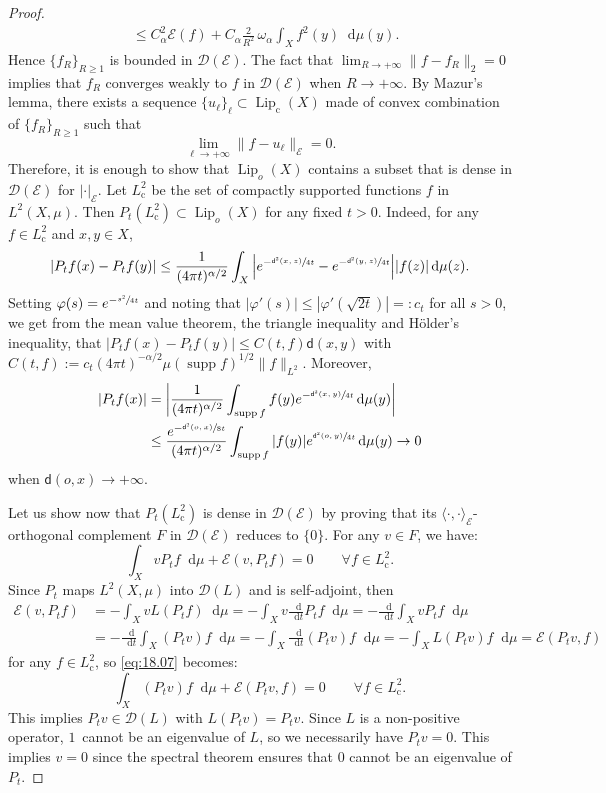 \documentclass[10pt]{amsart}
\newcommand{\rmc}{\mathrm{c}}
\theoremstyle{plain}
\theoremstyle{definition}
\newcommand{\cE}{\mathcal{E}}
\newcommand{\cD}{\mathcal{D}}
\let\phi\varphi
\newcommand{\di}{\mathop{}\!\mathrm{d}}
\DeclareMathOperator{\supp}{supp}
\DeclareMathOperator{\Lip}{Lip}
\newcommand{\dist}{\mathsf{d}}
\begin{document}
\begin{proof}
\begin{align*}
&\le C_\alpha^2 \cE(f)+C_\alpha \frac{2}{R^2}\, \omega_\alpha \int_X f^2(y)\di\mu(y).
\end{align*}
Hence $\{f_R\}_{R\ge 1}$ is bounded in $\cD(\cE)$. The fact that $\lim_{R\to +\infty} \|f-f_R\|_2=0$ implies that $f_R$ converges weakly to $f$ in $\cD(\cE)$ when $R\to+\infty$. By Mazur's lemma, there exists a sequence $\{u_\ell\}_\ell \subset \Lip_\rmc(X)$ made of convex combination of $\{f_R\}_{R\ge 1}$ such that
\[
\lim_{\ell\to +\infty} \|f-u_\ell\|_\cE=0.
\]
Therefore, it is enough to show that $\Lip_o(X)$ contains a subset that is dense in $\cD(\cE)$ for $|\cdot|_\cE$. Let $L^2_\rmc$ be the set of compactly supported functions $f$ in $L^2(X,\mu)$. Then $P_t(L^2_\rmc) \subset \Lip_o(X)$ for any fixed $t>0$. Indeed, for any $f \in L^2_\rmc$ and $x, y \in X$,
\[
|P_tf(x) - P_tf(y)|\le \frac{1}{(4\pi t)^{\alpha/2}} \int_X \Big|e^{-\sfrac{\dist^2(x,z)}{4t}}-e^{-\sfrac{\dist^2(y,z)}{4t}}\Big| |f(z)| \di \mu(z).
\]
Setting $\phi(s)=e^{-\sfrac{s^2}{4t}}$ and noting that $|\phi'(s)|\le |\phi'(\sqrt{2t})|=:c_t$ for all $s>0$, we get from the mean value theorem, the triangle inequality and Hölder's inequality, that $|P_tf(x) - P_tf(y)|\le C(t,f) \dist(x,y)$ with $C(t,f):=c_t(4 \pi t)^{-\alpha/2} \mu(\supp f)^{1/2} \| f \|_{L^2}$. Moreover,
\begin{align*}
|P_tf(x)| &= \left|\frac{1}{(4\pi t)^{\alpha/2}} \int_{\supp f} f(y) e^{-\sfrac{\dist^2(x,y)}{4t}} \di \mu(y)\right|\\
&\le \frac{ e^{-\sfrac{\dist^2(o,x)}{8t}} }{ (4\pi t)^{\alpha/2} } \int_{\supp f} |f(y)| e^{\sfrac{\dist^2(o,y)}{4t}} \di \mu(y) \to 0
\end{align*}
when $\dist(o,x) \to +\infty$.

Let us show now that $P_t(L^2_\rmc)$ is dense in $\cD(\cE)$ by proving that its $\langle \cdot, \cdot \rangle_{\cE}$-orthogonal complement $F$ in $\cD(\cE)$ reduces to $\{0\}$. For any $v\in F$, we have:
\begin{equation}\label{eq:18.07}
\int_X v P_t f \di \mu + \cE(v,P_t f)=0 \qquad \forall f \in L^2_\rmc.
\end{equation}
Since $P_t$ maps $L^2(X,\mu)$ into $\cD(L)$ and is self-adjoint, then
\begin{align*}
\cE(v,P_t f) & = - \int_X v L (P_t f) \di \mu = -\int_X v \frac{\di}{\di t} P_t f \di \mu = -\frac{\di}{\di t} \int_X v P_t f \di \mu\\
& = - \frac{\di}{\di t} \int_X (P_tv) f \di \mu
= -\int_X \frac{\di}{\di t}(P_tv) f \di \mu = - \int_X L(P_tv) f \di \mu = \cE(P_tv,f)
\end{align*}
for any $f \in L^2_\rmc$, so \eqref{eq:18.07} becomes:
\[
\int_X (P_tv) f \di \mu + \cE(P_t v,f)=0 \qquad \forall f \in L^2_\rmc.
\]
This implies $P_t v \in \cD(L)$ with $L (P_t v) = P_t v$. Since $L$ is a non-positive operator, $1$~cannot be an eigenvalue of $L$, so we necessarily have $P_t v = 0$. This implies $v=0$ since the spectral theorem ensures that $0$ cannot be an eigenvalue of $P_t$.
\end{proof}
\end{document}
